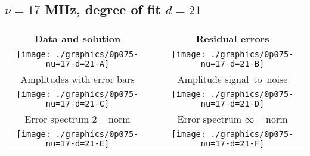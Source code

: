

% 

\clearpage{}
\break{}

\subsection{$\nu = 17$ MHz, degree of fit $d = 21$}

\begin{table}[h]
    \begin{center}
        \begin{tabular}{ccc}
            Data and solution & \quad & Residual errors \\\hline
            \texttt{[image: ./graphics/0p075-nu=17-d=21-A]} &&
            \texttt{[image: ./graphics/0p075-nu=17-d=21-B]} \\[15pt]
            Amplitudes with error bars && Amplitude signal--to--noise \\\hline
            \texttt{[image: ./graphics/0p075-nu=17-d=21-C]} &&
            \texttt{[image: ./graphics/0p075-nu=17-d=21-D]} \\[15pt]
            Error spectrum $2-$norm && Error spectrum $\infty-$norm \\\hline
            \texttt{[image: ./graphics/0p075-nu=17-d=21-E]} &&
            \texttt{[image: ./graphics/0p075-nu=17-d=21-F]} \\[15pt]
        \end{tabular}
    \end{center}
\label{fig:elev=75, nu=17}
\end{table}



\endinput
